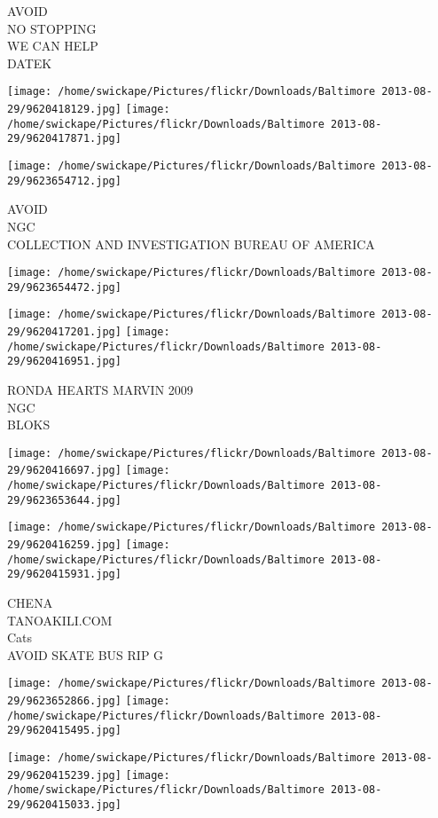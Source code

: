 \documentclass[10pt,letterpaper]{article}
\begin{document}
AVOID\\
NO STOPPING\\
WE CAN HELP\\
DATEK
\pagebreak

\texttt{[image: /home/swickape/Pictures/flickr/Downloads/Baltimore 2013-08-29/9620418129.jpg]}
\texttt{[image: /home/swickape/Pictures/flickr/Downloads/Baltimore 2013-08-29/9620417871.jpg]}

\vspace{0.25in}
\texttt{[image: /home/swickape/Pictures/flickr/Downloads/Baltimore 2013-08-29/9623654712.jpg]}

AVOID\\
NGC\\
COLLECTION AND INVESTIGATION BUREAU OF AMERICA
\pagebreak

\texttt{[image: /home/swickape/Pictures/flickr/Downloads/Baltimore 2013-08-29/9623654472.jpg]}

\vspace{0.25in}
\texttt{[image: /home/swickape/Pictures/flickr/Downloads/Baltimore 2013-08-29/9620417201.jpg]}
\texttt{[image: /home/swickape/Pictures/flickr/Downloads/Baltimore 2013-08-29/9620416951.jpg]}

RONDA HEARTS MARVIN 2009\\
NGC\\
BLOKS
\pagebreak

\texttt{[image: /home/swickape/Pictures/flickr/Downloads/Baltimore 2013-08-29/9620416697.jpg]}
\texttt{[image: /home/swickape/Pictures/flickr/Downloads/Baltimore 2013-08-29/9623653644.jpg]}

\texttt{[image: /home/swickape/Pictures/flickr/Downloads/Baltimore 2013-08-29/9620416259.jpg]}
\texttt{[image: /home/swickape/Pictures/flickr/Downloads/Baltimore 2013-08-29/9620415931.jpg]}

CHENA\\
TANOAKILI.COM\\
Cats\\
AVOID SKATE BUS RIP G
\pagebreak

\texttt{[image: /home/swickape/Pictures/flickr/Downloads/Baltimore 2013-08-29/9623652866.jpg]}
\texttt{[image: /home/swickape/Pictures/flickr/Downloads/Baltimore 2013-08-29/9620415495.jpg]}

\texttt{[image: /home/swickape/Pictures/flickr/Downloads/Baltimore 2013-08-29/9620415239.jpg]}
\texttt{[image: /home/swickape/Pictures/flickr/Downloads/Baltimore 2013-08-29/9620415033.jpg]}
\end{document}
